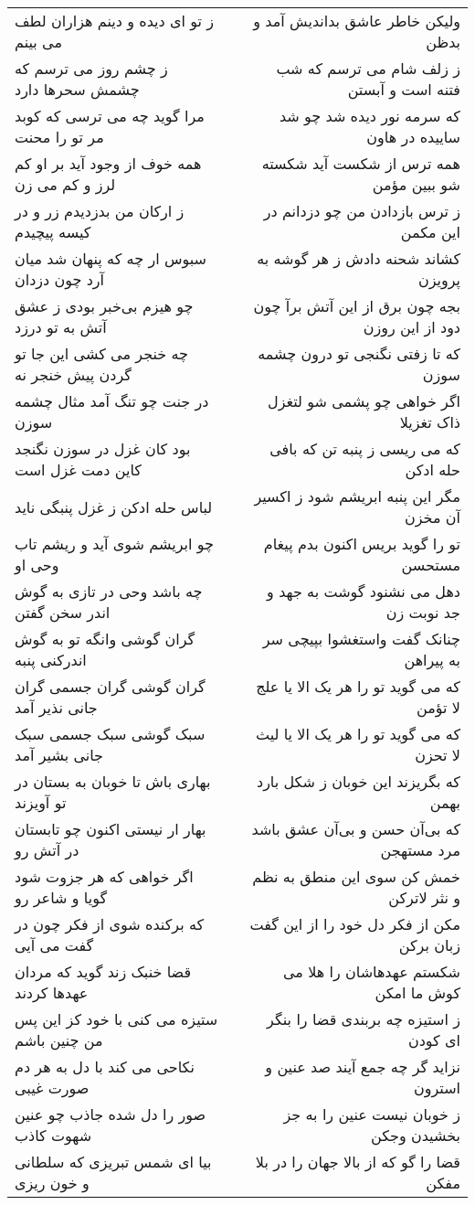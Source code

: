 \begin{center}
\begin{longtable}{l p{0.5cm} r}
ز تو ای دیده و دینم هزاران لطف می بینم
&&
ولیکن خاطر عاشق بداندیش آمد و بدظن
\\
ز چشم روز می ترسم که چشمش سحرها دارد
&&
ز زلف شام می ترسم که شب فتنه است و آبستن
\\
مرا گوید چه می ترسی که کوبد مر تو را محنت
&&
که سرمه نور دیده شد چو شد ساییده در هاون
\\
همه خوف از وجود آید بر او کم لرز و کم می زن
&&
همه ترس از شکست آید شکسته شو ببین مؤمن
\\
ز ارکان من بدزدیدم زر و در کیسه پیچیدم
&&
ز ترس بازدادن من چو دزدانم در این مکمن
\\
سبوس ار چه که پنهان شد میان آرد چون دزدان
&&
کشاند شحنه دادش ز هر گوشه به پرویزن
\\
چو هیزم بی‌خبر بودی ز عشق آتش به تو درزد
&&
بجه چون برق از این آتش برآ چون دود از این روزن
\\
چه خنجر می کشی این جا تو گردن پیش خنجر نه
&&
که تا زفتی نگنجی تو درون چشمه سوزن
\\
در جنت چو تنگ آمد مثال چشمه سوزن
&&
اگر خواهی چو پشمی شو لتغزل ذاک تغزیلا
\\
بود کان غزل در سوزن نگنجد کاین دمت غزل است
&&
که می ریسی ز پنبه تن که بافی حله ادکن
\\
لباس حله ادکن ز غزل پنبگی ناید
&&
مگر این پنبه ابریشم شود ز اکسیر آن مخزن
\\
چو ابریشم شوی آید و ریشم تاب وحی او
&&
تو را گوید بریس اکنون بدم پیغام مستحسن
\\
چه باشد وحی در تازی به گوش اندر سخن گفتن
&&
دهل می نشنود گوشت به جهد و جد نوبت زن
\\
گران گوشی وانگه تو به گوش اندرکنی پنبه
&&
چنانک گفت واستغشوا بپیچی سر به پیراهن
\\
گران گوشی گران جسمی گران جانی نذیر آمد
&&
که می گوید تو را هر یک الا یا علج لا تؤمن
\\
سبک گوشی سبک جسمی سبک جانی بشیر آمد
&&
که می گوید تو را هر یک الا یا لیث لا تحزن
\\
بهاری باش تا خوبان به بستان در تو آویزند
&&
که بگریزند این خوبان ز شکل بارد بهمن
\\
بهار ار نیستی اکنون چو تابستان در آتش رو
&&
که بی‌آن حسن و بی‌آن عشق باشد مرد مستهجن
\\
اگر خواهی که هر جزوت شود گویا و شاعر رو
&&
خمش کن سوی این منطق به نظم و نثر لاترکن
\\
که برکنده شوی از فکر چون در گفت می آیی
&&
مکن از فکر دل خود را از این گفت زبان برکن
\\
قضا خنبک زند گوید که مردان عهدها کردند
&&
شکستم عهدهاشان را هلا می کوش ما امکن
\\
ستیزه می کنی با خود کز این پس من چنین باشم
&&
ز استیزه چه بربندی قضا را بنگر ای کودن
\\
نکاحی می کند با دل به هر دم صورت غیبی
&&
نزاید گر چه جمع آیند صد عنین و استرون
\\
صور را دل شده جاذب چو عنین شهوت کاذب
&&
ز خوبان نیست عنین را به جز بخشیدن وجکن
\\
بیا ای شمس تبریزی که سلطانی و خون ریزی
&&
قضا را گو که از بالا جهان را در بلا مفکن
\\
\end{longtable}
\end{center}
